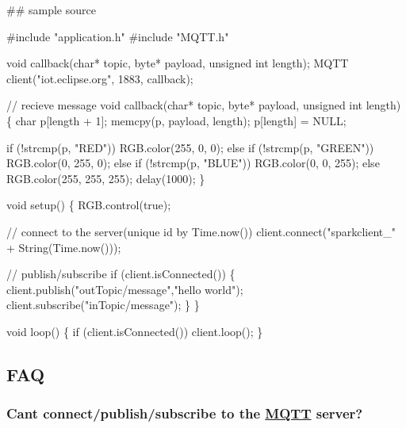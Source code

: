 \#\# sample source 
\begin{DoxyCode}
#include "application.h"
#include "MQTT.h"

void callback(char* topic, byte* payload, unsigned int length);
MQTT client("iot.eclipse.org", 1883, callback);

// recieve message
void callback(char* topic, byte* payload, unsigned int length) \{
    char p[length + 1];
    memcpy(p, payload, length);
    p[length] = NULL;

    if (!strcmp(p, "RED"))
        RGB.color(255, 0, 0);
    else if (!strcmp(p, "GREEN"))
        RGB.color(0, 255, 0);
    else if (!strcmp(p, "BLUE"))
        RGB.color(0, 0, 255);
    else
        RGB.color(255, 255, 255);
    delay(1000);
\}


void setup() \{
    RGB.control(true);

    // connect to the server(unique id by Time.now())
    client.connect("sparkclient\_" + String(Time.now()));

    // publish/subscribe
    if (client.isConnected()) \{
        client.publish("outTopic/message","hello world");
        client.subscribe("inTopic/message");
    \}
\}

void loop() \{
    if (client.isConnected())
        client.loop();
\}
\end{DoxyCode}
 \subsection*{F\+AQ}

\subsubsection*{Can\textquotesingle{}t connect/publish/subscribe to the \hyperlink{class_m_q_t_t}{M\+Q\+TT} server?}


